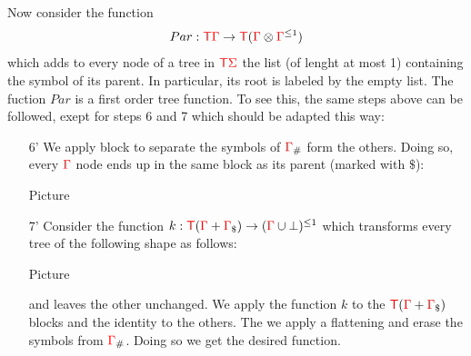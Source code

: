 \begin{example}
Now consider the function $$Par:{\color{red}{\mathsf T}}{\color{red}{\Gamma}}\to {\color{red}{\mathsf T}} ({\color{red}{\Gamma}}\otimes {\color{red}{\Gamma}}^{\leq 1})$$ which adds to every node of a tree in ${\color{red}{\mathsf T}} {\color{red}{\Sigma}}$ the list (of lenght at most 1) containing the symbol of its parent. In particular, its root is labeled by the empty list. 
The fuction $Par$ is a first order tree function. To see this, the same steps above can be followed, exept for steps 6 and 7 which should be adapted this way:
\begin{enumerate}
\item[6'] We apply block to separate the symbols of ${\color{red}{\Gamma}}_\#$ form the others. Doing so, every ${\color{red}{\Gamma}}$ node ends up in the same block as its parent (marked with $\$$):
\begin{center}
Picture
\end{center}
\item[7'] Consider the function $k:{\color{red}{\mathsf T}}({\color{red}{\Gamma}}+{\color{red}{\Gamma}}_\$)\to ({\color{red}{\Gamma}}\cup\bot)^{\leq 1}$ which transforms every tree of the following shape as follows:
\begin{center}
Picture
\end{center}
and leaves the other unchanged. We apply the function $k$ to the ${\color{red}{\mathsf T}}({\color{red}{\Gamma}}+{\color{red}{\Gamma}}_\$)$
blocks and the identity to the others. The we apply a flattening and erase the symbols from ${\color{red}{\Gamma}}_\#$. Doing so we get the desired function.
\end{enumerate} 
\end{example}




